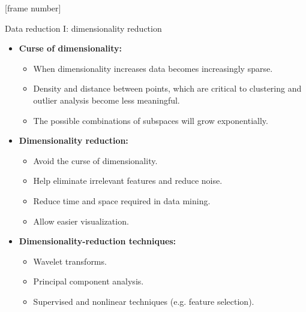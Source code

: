 \documentclass[aspectratio=169,t]{beamer}
\begin{document}
  {
    [frame number]
    \begin{frame}{Data reduction I: dimensionality reduction}
        \begin{itemize}
            \item \textbf{Curse of dimensionality:}
            \begin{itemize}
              \item When dimensionality increases data becomes increasingly sparse.
              \item Density and distance between points, which are critical to clustering and outlier analysis become less meaningful.
              \item The possible combinations of subspaces will grow exponentially.
            \end{itemize}
            \item \textbf{Dimensionality reduction:}
            \begin{itemize}
              \item Avoid the curse of dimensionality.
              \item Help eliminate irrelevant features and reduce noise.
              \item Reduce time and space required in data mining.
              \item Allow easier visualization.
            \end{itemize}
            \item \textbf{Dimensionality-reduction techniques:}
            \begin{itemize}
              \item Wavelet transforms.
              \item Principal component analysis.
              \item Supervised and nonlinear techniques (e.g. feature selection).
            \end{itemize}
        \end{itemize}
    \end{frame}
  }
\end{document}
